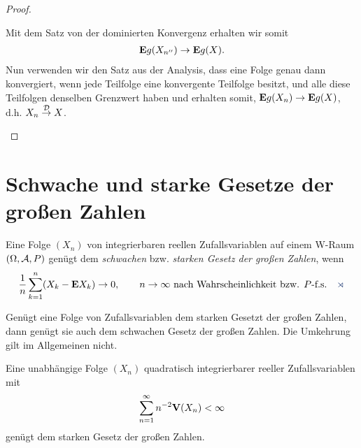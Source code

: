 \begin{proof}
\begin{proofenum}
Mit dem Satz von der dominierten Konvergenz erhalten wir somit
\begin{align*}
\E g(X_{n''})\to \E g(X).
\end{align*}
Nun verwenden wir den Satz aus der Analysis, dass eine Folge genau dann
konvergiert, wenn jede Teilfolge eine konvergente Teilfolge besitzt, und alle
diese Teilfolgen denselben Grenzwert haben und erhalten somit, $\E g(X_n)\to \E
g(X)$, d.h. $X_n\Dto X$.\qedhere
\end{proofenum}
\end{proof}

\section{Schwache und starke Gesetze der großen Zahlen}

\begin{defn}
\label{defn:8.2}
Eine Folge $(X_n)$ von integrierbaren reellen Zufallsvariablen auf einem W-Raum
$(\Omega,\AA,P)$ genügt dem \emph{schwachen} bzw. \emph{starken Gesetz der
großen Zahlen}, wenn
\begin{align*}
\frac{1}{n}\sum\limits_{k=1}^n (X_k-\E X_k) \to 0,\qquad n\to \infty\text{ nach
Wahrscheinlichkeit bzw. } P\text{-f.s.}\fishhere
\end{align*}
\end{defn}

\begin{bem}
\label{bem:8.2}
Genügt eine Folge von Zufallsvariablen dem starken Gesetzt der großen Zahlen,
dann genügt sie auch dem schwachen Gesetz der großen Zahlen. Die Umkehrung gilt
im Allgemeinen nicht.\maphere
\end{bem}

\begin{prop}
\label{prop:8.2}
Eine unabhängige Folge $(X_n)$ quadratisch integrierbarer reeller
Zufallsvariablen mit
\begin{align*}
\sum\limits_{n=1}^\infty n^{-2}\V(X_n) < \infty
\end{align*}
genügt dem starken Gesetz der großen Zahlen.\fishhere
\end{prop}

